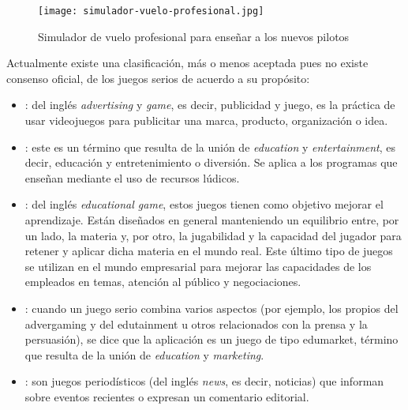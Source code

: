 \begin{figure}[H] 
	\begin{center}
		\texttt{[image: simulador-vuelo-profesional.jpg]}
	\end{center}
	\caption{Simulador de vuelo profesional para enseñar a los nuevos pilotos}
	\label{fig:simulador-vuelo}
\end{figure}

Actualmente existe una clasificación, más o menos aceptada pues no existe consenso oficial, de los juegos serios de acuerdo a su propósito:

\begin{itemize}
	\item {}: del inglés \emph{advertising} y \emph{game}, es decir, publicidad y juego, es la práctica de usar videojuegos para publicitar una marca, producto, organización o idea.
	
	\item {}: este es un término que resulta de la unión de \emph{education} y \emph{entertainment}, es decir, educación y entretenimiento o diversión. Se aplica a los programas que enseñan mediante el uso de recursos lúdicos.
	
	\item {}: del inglés \emph{educational game}, estos juegos tienen como objetivo mejorar el aprendizaje. Están diseñados en general manteniendo un equilibrio entre, por un lado, la materia y, por otro, la jugabilidad y la capacidad del jugador para retener y aplicar dicha materia en el mundo real. Este último tipo de juegos se utilizan en el mundo empresarial para mejorar las capacidades de los empleados en temas, atención al público y negociaciones.
	
	\item {}: cuando un juego serio combina varios aspectos (por ejemplo, los propios del advergaming y del edutainment u otros relacionados con la prensa y la persuasión), se dice que la aplicación es un juego de tipo edumarket, término que resulta de la unión de \emph{education} y \emph{marketing}.
	
	\item {}: son juegos periodísticos (del inglés \emph{news}, es decir, noticias) que informan sobre eventos recientes o expresan un comentario editorial.
	

\end{itemize}
